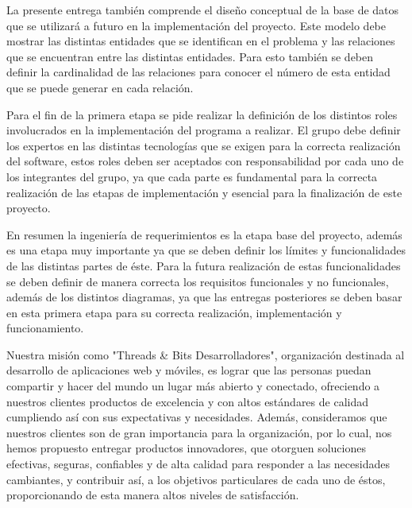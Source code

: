 \documentclass{memoria}
\begin{document}
La presente entrega también comprende el diseño conceptual de la base de datos que se utilizará a futuro en la implementación del proyecto. Este modelo debe mostrar las distintas entidades que se identifican en el problema y las relaciones que se encuentran entre las distintas entidades. Para esto también se deben definir la cardinalidad de las relaciones para conocer el número de esta entidad que se puede generar en cada relación.

Para el fin de la primera etapa se pide realizar la definición de los distintos roles involucrados en la implementación del programa a realizar. El grupo debe definir los expertos en las distintas tecnologías que se exigen para la correcta realización del software, estos roles deben ser aceptados con responsabilidad por cada uno de los integrantes del grupo, ya que cada parte es fundamental para la correcta realización de las etapas de implementación y esencial para la finalización de este proyecto.

En resumen la ingeniería de requerimientos es la etapa base del proyecto, además es una etapa muy importante ya que se deben definir los límites y funcionalidades de las distintas partes de éste. Para la futura realización de estas funcionalidades se deben definir de manera correcta los requisitos funcionales y no funcionales, además de los distintos diagramas, ya que las entregas posteriores se deben basar en esta primera etapa para su correcta realización, implementación y funcionamiento.





Nuestra misión como "Threads \& Bits Desarrolladores", organización destinada al desarrollo de aplicaciones web y móviles, es  lograr que las personas puedan compartir y hacer del mundo un lugar más abierto y conectado, ofreciendo a nuestros clientes productos de excelencia y con altos estándares de calidad cumpliendo así con sus expectativas y necesidades. Además, consideramos que nuestros clientes son de gran importancia para la organización, por lo cual, nos hemos propuesto entregar productos innovadores, que otorguen soluciones efectivas, seguras, confiables y de alta calidad para responder a las necesidades cambiantes, y contribuir así, a los objetivos particulares de cada uno de éstos, proporcionando de esta manera altos niveles de satisfacción.
\end{document}
